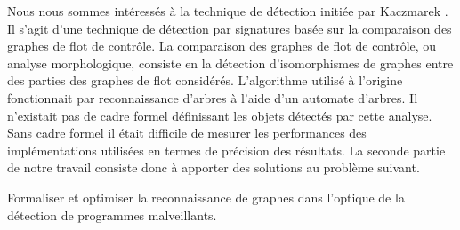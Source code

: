 Nous nous sommes intéressés à la technique de détection initiée par Kaczmarek \cite{BKM08}. Il s'agit d'une technique de détection par signatures basée sur la comparaison des graphes de flot de contrôle. %
La comparaison des graphes de flot de contrôle, ou analyse morphologique, consiste en la détection d'isomorphismes de graphes entre des parties des graphes de flot considérés. 
L'algorithme utilisé à l'origine fonctionnait par reconnaissance d'arbres à l'aide d'un automate d'arbres. Il n'existait pas de cadre formel définissant les objets détectés par cette analyse. Sans cadre formel il était difficile de mesurer les performances des implémentations utilisées en termes de précision des résultats.
La seconde partie de notre travail consiste donc à apporter des solutions au problème suivant.
\begin{pbb}
 Formaliser et optimiser la reconnaissance de graphes dans l'optique de la détection de programmes malveillants.
\end{pbb}













